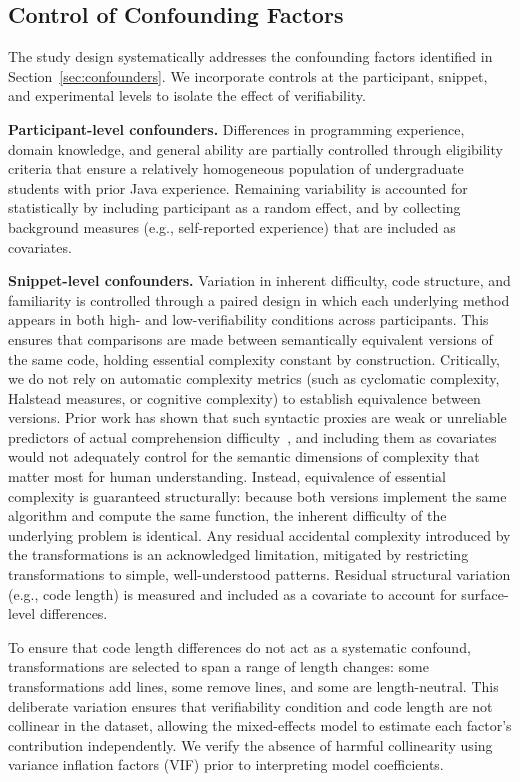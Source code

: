 \subsection{Control of Confounding Factors}
\label{sec:confounder-control}

The study design systematically addresses the confounding factors identified in Section~\ref{sec:confounders}. We incorporate controls at the participant, snippet, and experimental levels to isolate the effect of verifiability.

\textbf{Participant-level confounders.}
Differences in programming experience, domain knowledge, and general ability are partially controlled through eligibility criteria that ensure a relatively homogeneous population of undergraduate students with prior Java experience. Remaining variability is accounted for statistically by including participant as a random effect, and by collecting background measures (e.g., self-reported experience) that are included as covariates.

\textbf{Snippet-level confounders.}
Variation in inherent difficulty, code structure, and familiarity is controlled through a paired design in which each underlying method appears in both high- and low-verifiability conditions across participants. This ensures that comparisons are made between semantically equivalent versions of the same code, holding essential complexity constant by construction. Critically, we do not rely on automatic complexity metrics (such as cyclomatic complexity, Halstead measures, or cognitive complexity) to establish equivalence between versions. Prior work has shown that such syntactic proxies are weak or unreliable predictors of actual comprehension difficulty~\cite{FeldmanKC2023}, and including them as covariates would not adequately control for the semantic dimensions of complexity that matter most for human understanding. Instead, equivalence of essential complexity is guaranteed structurally: because both versions implement the same algorithm and compute the same function, the inherent difficulty of the underlying problem is identical. Any residual accidental complexity introduced by the transformations is an acknowledged limitation, mitigated by restricting transformations to simple, well-understood patterns. Residual structural variation (e.g., code length) is measured and included as a covariate to account for surface-level differences.

To ensure that code length differences do not act as a systematic confound, transformations are selected to span a range of length changes: some transformations add lines, some remove lines, and some are length-neutral. This deliberate variation ensures that verifiability condition and code length are not collinear in the dataset, allowing the mixed-effects model to estimate each factor's contribution independently. We verify the absence of harmful collinearity using variance inflation factors (VIF) prior to interpreting model coefficients.

